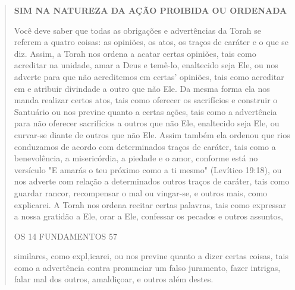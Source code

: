 \begin{quote}
\textbf{SIM NA NATUREZA DA AÇÃO PROIBIDA OU ORDENADA}

Você deve saber que todas as obrigações e advertências da Torah se
referem a quatro coisas: as opiniões, os atos, os traços de caráter e o
que se diz. Assim, a Torah nos ordena a acatar certas opiniões, tais
como acreditar na unidade, amar a Deus e temê-lo, enaltecido seja Ele,
ou nos adverte para que não acreditemos em certas' opiniões, tais como
acreditar em e atribuir divinda­de a outro que não Ele. Da mesma forma
ela nos manda realizar certos atos, tais como oferecer os sacrifícios e
construir o Santuário ou nos previne quanto a certas ações, tais como a
advertência para não oferecer sacrifícios a outros que não Ele,
enaltecido seja Ele, ou curvar-se diante de outros que não Ele. As­sim
também ela ordenou que rios conduzamos de acordo com determinados traços
de caráter, tais como a benevolência, a misericórdia, a piedade e o
amor, conforme está no versículo "E amarás o teu próximo como a ti
mesmo" (Leví­tico 19:18), ou nos adverte com relação a determinados
outros traços de cará­ter, tais como guardar rancor, recompensar o mal
ou vingar-se, e outros mais, como explicarei. A Torah nos ordena recitar
certas palavras, tais como expres­sar a nossa gratidão a Ele, orar a
Ele, confessar os pecados e outros assuntos,

OS 14 FUNDAMENTOS 57

similares, como expl,icarei, ou nos previne quanto a dizer certas
coisas, tais co­mo a advertência contra pronunciar um falso juramento,
fazer intrigas, falar mal dos outros, amaldiçoar, e outros além destes.


\end{quote}
